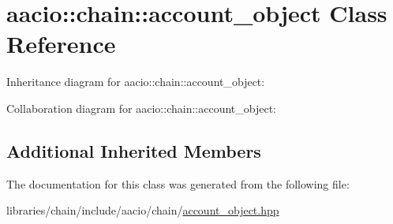 \hypertarget{classaacio_1_1chain_1_1account__object}{}\section{aacio\+:\+:chain\+:\+:account\+\_\+object Class Reference}
\label{classaacio_1_1chain_1_1account__object}


Inheritance diagram for aacio\+:\+:chain\+:\+:account\+\_\+object\+:


Collaboration diagram for aacio\+:\+:chain\+:\+:account\+\_\+object\+:
\subsection*{Additional Inherited Members}


The documentation for this class was generated from the following file\+:\begin{DoxyCompactItemize}
\item 
libraries/chain/include/aacio/chain/\mbox{\hyperlink{account__object_8hpp}{account\+\_\+object.\+hpp}}\end{DoxyCompactItemize}
